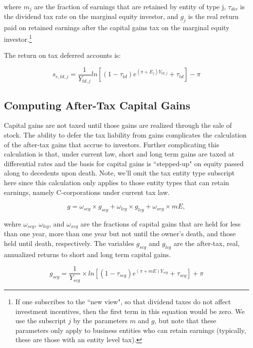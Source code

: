 \documentclass[article,11pt,letterpaper,fleqn]{article}
\theoremstyle{definition}
\numberwithin{equation}{section}
\begin{document}
\noindent\noindent where $m_{j}$ are the fraction of earnings that are retained by entity of type j, $\tau_{div}$ is the dividend tax rate on the marginal equity investor, and $g_{j}$ is the real return paid on retained earnings after the capital gains tax on the marginal equity investor.\footnote{If one subscribes to the ``new view", so that dividend taxes do not affect investment incentives, then the first term in this equation would be zero.  We use the subscript $j$ by the parameters $m$ and $g$, but note that these parameters only apply to business entities who can retain earnings (typically, these are those with an entity level tax).}
 
 The return on tax deferred accounts is:
 
 \begin{equation}
s_{e,td,j} = \frac{1}{Y_{td,j}}ln \left[(1-\tau_{td})e^{(\pi+E_{j})Y_{td,j}}+\tau_{td}\right]-\pi
\end{equation}
 

\subsection{Computing After-Tax Capital Gains}

Capital gains are not taxed until those gains are realized through the sale of stock.  The ability to defer the tax liability from gains complicates the calculation of the after-tax gains that accrue to investors. Further complicating this calculation is that, under current law, short and long term gains are taxed at differential rates and the basis for capital gains is ``stepped-up" on equity passed along to decedents upon death.  Note, we'll omit the tax entity type subscript here since this calculation only applies to those entity types that can retain earnings, namely C-corporations under current tax law. 

\begin{equation}
g = \omega_{scg}\times g_{scg} + \omega_{lcg}\times g_{lcg} + \omega_{xcg}\times mE,
\end{equation}
 
 \noindent\noindent wehre $\omega_{scg}$, $\omega_{lcg}$, and $\omega_{xcg}$ are the fractions of capital gains that are held for less than one year, more than one year but not until the owner's death, and those held until death, respectively.  The variables $g_{scg}$ and $g_{lcg}$ are the after-tax, real, annualized returns to short and long term capital gains.
 
\begin{equation}
g_{scg} = \frac{1}{Y_{scg}}\times ln\left[(1-\tau_{scg})e^{(\pi+mE)Y_{scg}}+\tau_{scg}\right]+\pi
\end{equation}
\end{document}
